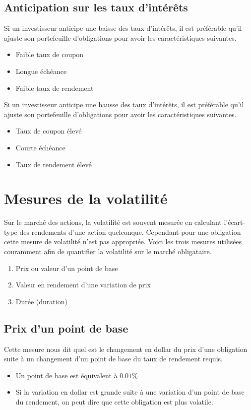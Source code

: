 \documentclass[12pt]{article}
\begin{document}
\subsection{Anticipation sur les taux d'intérêts}
Si un investisseur anticipe une baisse des taux d'intérêts,  il est préférable qu'il ajuste son portefeuille d'obligations pour avoir les caractéristiques suivantes.
\begin{itemize}
\item Faible taux de coupon
\item Longue échéance 
\item Faible taux de rendement 
\end{itemize}
Si un investisseur anticipe une hausse des taux d'intérêts, il est préférable qu'il ajuste son portefeuille d'obligations pour avoir les caractéristiques suivantes.
\begin{itemize}
\item Taux de coupon élevé
\item Courte échéance 
\item Taux de rendement élevé
\end{itemize}
\section{Mesures de la volatilité}
Sur le marché des actions, la volatilité est souvent mesurée en calculant l'écart-type des rendements d'une action quelconque. Cependant pour une obligation cette mesure de volatilité n'est pas appropriée.  Voici les trois mesures utilisées couramment afin de quantifier la volatilité sur le marché obligataire.
\begin{enumerate}
\item Prix ou valeur d’un point de base
\item Valeur en rendement d’une variation de prix
\item Durée (duration)
\end{enumerate}
\subsection{Prix d’un point de base}
Cette mesure nous dit quel est le changement en dollar du prix d'une obligation suite à un changement d'un point de base du taux de rendement requis.
\begin{itemize}
\item Un point de base est équivalent à $0.01\%$
\item Si la variation en dollar est grande suite à une variation d'un point de base du rendement, on peut dire que cette obligation est plus volatile.
\end{itemize}
\end{document}
